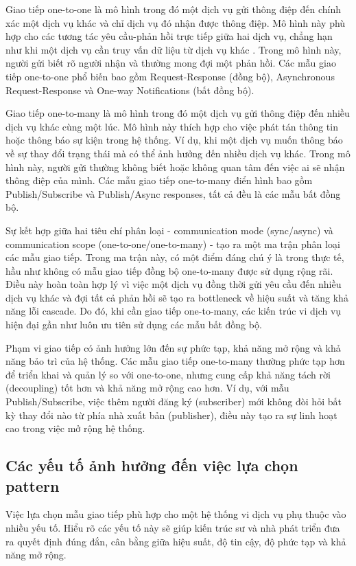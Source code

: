 Giao tiếp one-to-one là mô hình trong đó một dịch vụ gửi thông điệp đến chính xác một dịch vụ khác và chỉ dịch vụ đó nhận được thông điệp. Mô hình này phù hợp cho các tương tác yêu cầu-phản hồi trực tiếp giữa hai dịch vụ, chẳng hạn như khi một dịch vụ cần truy vấn dữ liệu từ dịch vụ khác \cite{richardson2019}. Trong mô hình này, người gửi biết rõ người nhận và thường mong đợi một phản hồi. Các mẫu giao tiếp one-to-one phổ biến bao gồm Request-Response (đồng bộ), Asynchronous Request-Response và One-way Notifications (bất đồng bộ).

Giao tiếp one-to-many là mô hình trong đó một dịch vụ gửi thông điệp đến nhiều dịch vụ khác cùng một lúc. Mô hình này thích hợp cho việc phát tán thông tin hoặc thông báo sự kiện trong hệ thống. Ví dụ, khi một dịch vụ muốn thông báo về sự thay đổi trạng thái mà có thể ảnh hưởng đến nhiều dịch vụ khác. Trong mô hình này, người gửi thường không biết hoặc không quan tâm đến việc ai sẽ nhận thông điệp của mình. Các mẫu giao tiếp one-to-many điển hình bao gồm Publish/Subscribe và Publish/Async responses, tất cả đều là các mẫu bất đồng bộ.

Sự kết hợp giữa hai tiêu chí phân loại - communication mode (sync/async) và communication scope (one-to-one/one-to-many) - tạo ra một ma trận phân loại các mẫu giao tiếp. Trong ma trận này, có một điểm đáng chú ý là trong thực tế, hầu như không có mẫu giao tiếp đồng bộ one-to-many được sử dụng rộng rãi. Điều này hoàn toàn hợp lý vì việc một dịch vụ đồng thời gửi yêu cầu đến nhiều dịch vụ khác và đợi tất cả phản hồi sẽ tạo ra bottleneck về hiệu suất và tăng khả năng lỗi cascade. Do đó, khi cần giao tiếp one-to-many, các kiến trúc vi dịch vụ hiện đại gần như luôn ưu tiên sử dụng các mẫu bất đồng bộ.

Phạm vi giao tiếp có ảnh hưởng lớn đến sự phức tạp, khả năng mở rộng và khả năng bảo trì của hệ thống. Các mẫu giao tiếp one-to-many thường phức tạp hơn để triển khai và quản lý so với one-to-one, nhưng cung cấp khả năng tách rời (decoupling) tốt hơn và khả năng mở rộng cao hơn. Ví dụ, với mẫu Publish/Subscribe, việc thêm người đăng ký (subscriber) mới không đòi hỏi bất kỳ thay đổi nào từ phía nhà xuất bản (publisher), điều này tạo ra sự linh hoạt cao trong việc mở rộng hệ thống.

\subsection{Các yếu tố ảnh hưởng đến việc lựa chọn pattern}
Việc lựa chọn mẫu giao tiếp phù hợp cho một hệ thống vi dịch vụ phụ thuộc vào nhiều yếu tố. Hiểu rõ các yếu tố này sẽ giúp kiến trúc sư và nhà phát triển đưa ra quyết định đúng đắn, cân bằng giữa hiệu suất, độ tin cậy, độ phức tạp và khả năng mở rộng.

